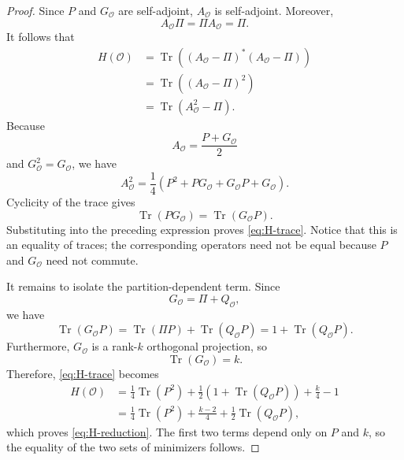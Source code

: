 \documentclass[10pt,a4paper]{amsart}
\begin{document}
\begin{proof}
	Since $P$ and $G_{\mathcal O}$ are self-adjoint,
	$A_{\mathcal O}$ is self-adjoint.  Moreover,
	\[
	A_{\mathcal O}\Pi
	=\Pi A_{\mathcal O}
	=\Pi.
	\]
	It follows that
	\[
	\begin{aligned}
		H(\mathcal O)
		&=\operatorname{Tr}\left(
		(A_{\mathcal O}-\Pi)^*
		(A_{\mathcal O}-\Pi)
		\right) \\
		&=\operatorname{Tr}\left(
		(A_{\mathcal O}-\Pi)^2
		\right) \\
		&=\operatorname{Tr}(A_{\mathcal O}^2-\Pi).
	\end{aligned}
	\]
	Because
	\[
	A_{\mathcal O}
	=\frac{P+G_{\mathcal O}}{2}
	\]
	and $G_{\mathcal O}^2=G_{\mathcal O}$, we have
	\[
	A_{\mathcal O}^2
	=\frac14\left(
	P^2+PG_{\mathcal O}
	+G_{\mathcal O}P+G_{\mathcal O}
	\right).
	\]
	Cyclicity of the trace gives
	\[
	\operatorname{Tr}(PG_{\mathcal O})
	=\operatorname{Tr}(G_{\mathcal O}P).
	\]
	Substituting into the preceding expression proves
	\eqref{eq:H-trace}.  Notice that this is an equality of traces;
	the corresponding operators need not be equal because $P$ and
	$G_{\mathcal O}$ need not commute.
	
	It remains to isolate the partition-dependent term.  Since
	\[
	G_{\mathcal O}=\Pi+Q_{\mathcal O},
	\]
	we have
	\[
	\operatorname{Tr}(G_{\mathcal O}P)
	=\operatorname{Tr}(\Pi P)
	+\operatorname{Tr}(Q_{\mathcal O}P)
	=1+\operatorname{Tr}(Q_{\mathcal O}P).
	\]
	Furthermore, $G_{\mathcal O}$ is a rank-$k$ orthogonal projection, so
	\[
	\operatorname{Tr}(G_{\mathcal O})=k.
	\]
	Therefore, \eqref{eq:H-trace} becomes
	\[
	\begin{aligned}
		H(\mathcal O)
		&=\frac14\operatorname{Tr}(P^2)
		+\frac12\left(
		1+\operatorname{Tr}(Q_{\mathcal O}P)
		\right)
		+\frac{k}{4}-1 \\
		&=\frac14\operatorname{Tr}(P^2)
		+\frac{k-2}{4}
		+\frac12\operatorname{Tr}(Q_{\mathcal O}P),
	\end{aligned}
	\]
	which proves \eqref{eq:H-reduction}.  The first two terms depend only
	on $P$ and $k$, so the equality of the two sets of minimizers follows.
\end{proof}
\end{document}
